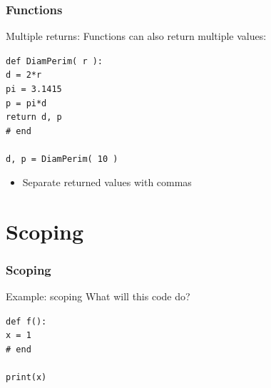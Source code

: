 \documentclass{beamer}
\newcommand{\code}[1]{\texttt{#1}}
\newcommand{\tab}{\hspace*{22pt}}
\begin{document}
\begin{frame}%
	\frametitle{Functions}
	
	\begin{block}{Multiple returns:}
		Functions can also return multiple values:
		
		\vspace{10pt}
			\code{def DiamPerim( r ): \\
			\tab d = 2*r \\
			\tab pi = 3.1415 \\
			\tab p = pi*d \\
    			\tab return d, p \\
			\# end \\
			\tab \\
			d, p = DiamPerim( 10 )
			}
			
			
		\endminipage\hfill
			\begin{itemize}
			\item Separate returned values with commas
			\end{itemize}
		\endminipage\hfill
	\end{block}
	
\end{frame}


\section{Scoping}

\begin{frame}	
\end{frame}

\begin{frame}%
	\frametitle{Scoping}
	
	\begin{block}{Example: scoping}
			What will this code do?
			
			\vspace{10pt}
			
			\code{def f():\\
			\tab x = 1 \\
			\#  end \\
			\tab \\
			print(x)
			}
		\endminipage\hfill
			
		\endminipage\hfill
	\end{block}
	
\end{frame}
\end{document}
